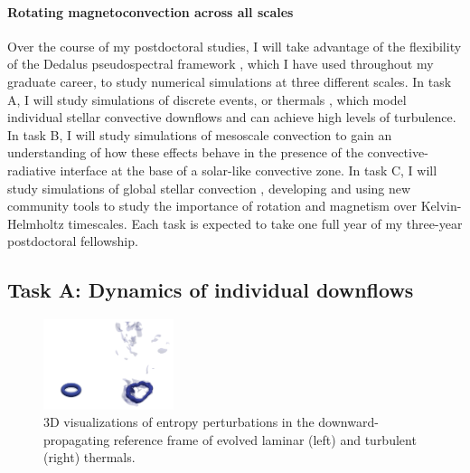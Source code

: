 \documentclass[11pt, preprint]{aastex}
\begin{document}
\paragraph{Rotating magnetoconvection across all scales}
Over the course of my postdoctoral studies, I will take advantage of the flexibility of the Dedalus pseudospectral framework \citep{burns&all2019}, which I have used throughout my graduate career, to study numerical simulations at three different scales.
In task A, I will study simulations of discrete events, or thermals \citep[as in][]{andersLB2019}, which model individual stellar convective downflows and can achieve high levels of turbulence.
In task B, I will study simulations of mesoscale convection \citep[as in][]{anders&brown2017} to gain an understanding of how these effects behave in the presence of the convective-radiative interface at the base of a solar-like convective zone.
In task C, I will study simulations of global stellar convection \citep[as in][]{lecoanet&all2019}, developing and using new community tools to study the importance of rotation and magnetism over Kelvin-Helmholtz timescales.
Each task is expected to take one full year of my three-year postdoctoral fellowship.

\vspace{-0.8cm}
\subsection*{Task A: Dynamics of individual downflows}
\vspace{-0.3cm}
\label{sct:taskA}
\begin{figure}
	\begin{center}
	\vspace{-30pt}
    \includegraphics[width=0.34\textwidth]{./figs/thermals_comparison.png}
	\vspace{-20pt}
	\end{center}
    \caption{
	3D visualizations of entropy perturbations in the downward-propagating reference frame of evolved laminar (left) and turbulent (right) thermals.
	\label{fig:thermals_comparison} }
	\vspace{-11pt}
\end{figure}
\end{document}
